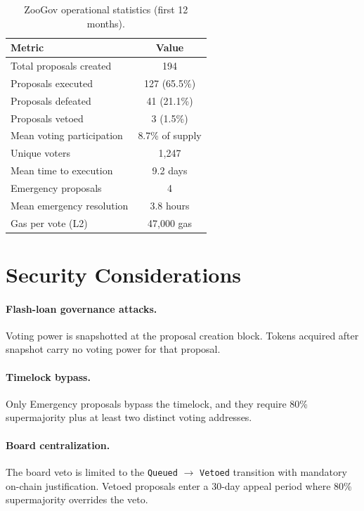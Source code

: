 \documentclass[11pt,letterpaper]{article}
\begin{document}
\begin{table}[h]
\centering
\caption{ZooGov operational statistics (first 12 months).}
\label{tab:ops}
\begin{tabular}{lc}
\toprule
\textbf{Metric} & \textbf{Value} \\
\midrule
Total proposals created & 194 \\
Proposals executed & 127 (65.5\%) \\
Proposals defeated & 41 (21.1\%) \\
Proposals vetoed & 3 (1.5\%) \\
Mean voting participation & 8.7\% of supply \\
Unique voters & 1{,}247 \\
Mean time to execution & 9.2 days \\
Emergency proposals & 4 \\
Mean emergency resolution & 3.8 hours \\
Gas per vote (L2) & 47{,}000 gas \\
\bottomrule
\end{tabular}
\end{table}

\section{Security Considerations}
\label{sec:security}

\paragraph{Flash-loan governance attacks.} Voting power is snapshotted at the proposal creation block. Tokens acquired after snapshot carry no voting power for that proposal.

\paragraph{Timelock bypass.} Only Emergency proposals bypass the timelock, and they require 80\% supermajority plus at least two distinct voting addresses.

\paragraph{Board centralization.} The board veto is limited to the \texttt{Queued} $\to$ \texttt{Vetoed} transition with mandatory on-chain justification. Vetoed proposals enter a 30-day appeal period where 80\% supermajority overrides the veto.
\end{document}
